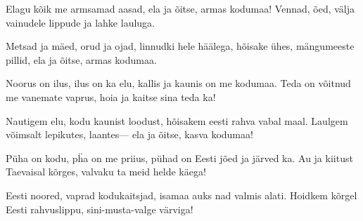 Elagu k\~oik me armsamad aasad,
ela ja \~oitse, armas kodumaa!
Vennad, \~oed, v\"alja vainudele
lippude ja lahke lauluga.

Metsad ja m\"aed, orud ja ojad,
linnudki hele h\"a\"alega,
h\~oisake \"uhes, m\"angumeeste pillid,
ela ja \~oitse, armas kodumaa.

Noorus on ilus, ilus on ka elu,
kallis ja kaunis on me kodumaa.
Teda on v\~oitnud me vanemate vaprus,
hoia ja kaitse sina teda ka!

Nautigem elu, kodu kaunist loodust,
h\~oisakem eesti rahva vabal maal.
Laulgem v\~oimsalt lepikutes, laantes---
ela ja \~oitse, kasva kodumaa!

P\"uha on kodu, p\"ha on me priius,
p\"uhad on Eesti j\~oed ja j\"arved ka.
Au ja kiitust Taevaisal k\~orges,
valvaku ta meid helde k\"aega!

Eesti noored, vaprad kodukaitsjad,
isamaa auks nad valmis alati.
Hoidkem k\~orgel Eesti rahvuslippu,
sini-musta-valge v\"arviga!